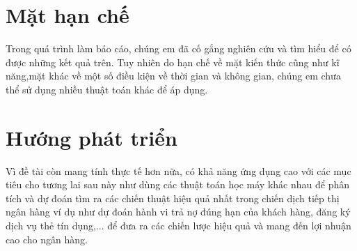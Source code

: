 \documentclass{report}
\begin{document}
\fontsize{14}{10}\selectfont
\section{Mặt hạn chế}
     \fontsize{13}{14}\selectfont
     Trong quá trình làm báo cáo, chúng em đã cố gắng nghiên cứu và tìm hiểu để có được những kết quả trên. Tuy nhiên do hạn chế về mặt kiến thức cũng như kĩ năng,mặt khác về một số điều kiện về thời gian và không gian, chúng em chưa thể sử dụng nhiều thuật toán khác để áp dụng. 

\fontsize{14}{10}\selectfont
\section{Hướng phát triển}
     \fontsize{13}{14}\selectfont
     Vì đề tài còn mang tính thực tế hơn nữa, có khả năng ứng dụng cao với các mục tiêu cho tương lai sau này như dùng các thuật toán học máy khác nhau để phân tích và dự đoán tìm ra các chiến thuật hiệu quả nhất trong chiến dịch tiếp thị ngân hàng ví dụ như dự đoán hành vi trả nợ đúng hạn của khách hàng, đăng ký dịch vụ thẻ tín dụng,... để đưa ra các chiến lược hiệu quả và mang đến lợi nhuận cao cho ngân hàng.


\fontsize{18}{10}\selectfont
\end{document}
